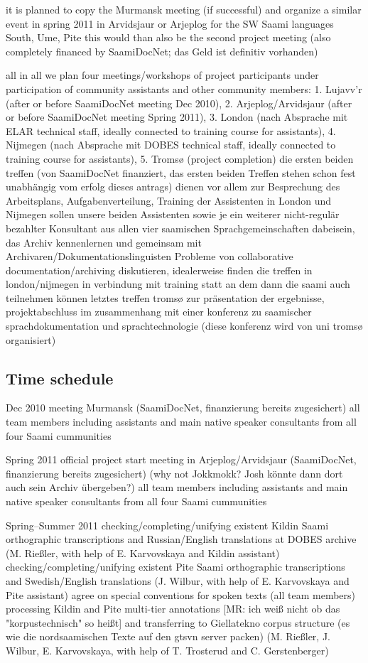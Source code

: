 \documentclass[a4paper,12pt]{article}
\begin{document}
it is planned to copy the Murmansk meeting (if successful) and organize a similar event in spring 2011 in Arvidsjaur or Arjeplog for the SW Saami languages South, Ume, Pite
this would than also be the second project meeting (also completely financed by SaamiDocNet; das Geld ist definitiv vorhanden)

all in all we plan four meetings/workshops of project participants under participation of community assistants and other community members: 1. Lujavv'r (after or before SaamiDocNet meeting Dec 2010), 2. Arjeplog/Arvidsjaur (after or before SaamiDocNet meeting Spring 2011), 3. London (nach Absprache mit ELAR technical staff, ideally connected to training course for assistants), 4. Nijmegen (nach Absprache mit DOBES technical staff, ideally connected to training course for assistants), 5. Tromsø (project completion)
die ersten beiden treffen (von SaamiDocNet finanziert, das ersten beiden Treffen stehen schon fest unabhängig vom erfolg dieses antrags) dienen vor allem zur Besprechung des Arbeitsplans, Aufgabenverteilung, Training der Assistenten
in London und Nijmegen sollen unsere beiden Assistenten sowie je ein weiterer nicht-regulär bezahlter Konsultant aus allen vier saamischen Sprachgemeinschaften dabeisein, das Archiv kennenlernen und gemeinsam mit Archivaren/Dokumentationslinguisten Probleme von collaborative documentation/archiving diskutieren, idealerweise finden die treffen in london/nijmegen in verbindung mit training statt an dem dann die saami auch teilnehmen können
letztes treffen tromsø zur präsentation der ergebnisse, projektabschluss im zusammenhang mit einer konferenz zu saamischer sprachdokumentation und sprachtechnologie (diese konferenz wird von uni tromsø organisiert)

\subsection{Time schedule}

Dec 2010
meeting Murmansk (SaamiDocNet, finanzierung bereits zugesichert)
all team members including assistants and main native speaker consultants from all four Saami cummunities

Spring 2011
official project start
meeting in Arjeplog/Arvidsjaur (SaamiDocNet, finanzierung bereits zugesichert)
(why not Jokkmokk? Josh könnte dann dort auch sein Archiv übergeben?)
all team members including assistants and main native speaker consultants from all four Saami cummunities

Spring–Summer 2011
checking/completing/unifying existent Kildin Saami orthographic transcriptions and Russian/English translations at DOBES archive 
(M. Rießler, with help of E. Karvovskaya and Kildin assistant)
checking/completing/unifying existent Pite Saami orthographic transcriptions and Swedish/English translations
(J. Wilbur, with help of E. Karvovskaya and Pite assistant)
agree on special conventions for spoken texts
(all team members)
processing Kildin and Pite multi-tier annotations [MR: ich weiß nicht ob das "korpustechnisch" so heißt] and transferring to Giellatekno corpus structure (es wie die nordsaamischen Texte auf den gtsvn server packen)
(M. Rießler, J. Wilbur, E. Karvovskaya, with help of T. Trosterud and C. Gerstenberger)
\end{document}

